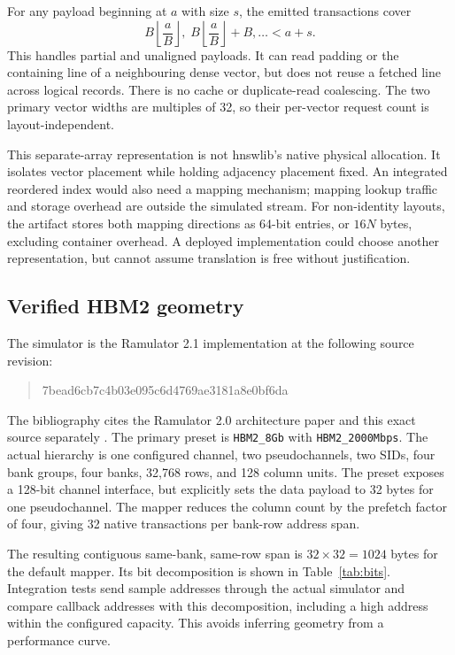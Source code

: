 \documentclass[11pt,a4paper]{report}
\begin{document}
For any payload beginning at $a$ with size $s$, the emitted transactions cover
\begin{equation}
 B\left\lfloor\frac{a}{B}\right\rfloor,\;B\left\lfloor\frac{a}{B}\right\rfloor+B,\ldots < a+s.
\end{equation}
This handles partial and unaligned payloads. It can read padding or the containing line of a neighbouring dense vector, but does not reuse a fetched line across logical records. There is no cache or duplicate-read coalescing. The two primary vector widths are multiples of 32, so their per-vector request count is layout-independent.

This separate-array representation is not hnswlib's native physical allocation. It isolates vector placement while holding adjacency placement fixed. An integrated reordered index would also need a mapping mechanism; mapping lookup traffic and storage overhead are outside the simulated stream. For non-identity layouts, the artifact stores both mapping directions as 64-bit entries, or $16N$ bytes, excluding container overhead. A deployed implementation could choose another representation, but cannot assume translation is free without justification.

\subsection{Verified HBM2 geometry}
\label{sec:geometry}
The simulator is the Ramulator 2.1 implementation at the following source revision:
\begin{quote}\small\ttfamily
7bead6cb7c4b03e095c6d4769ae3181a8e0bf6da
\end{quote}
The bibliography cites the Ramulator 2.0 architecture paper and this exact source separately \cite{ramulator,ramsource}. The primary preset is \texttt{HBM2\_8Gb} with \texttt{HBM2\_2000Mbps}. The actual hierarchy is one configured channel, two pseudochannels, two SIDs, four bank groups, four banks, 32,768 rows, and 128 column units. The preset exposes a 128-bit channel interface, but explicitly sets the data payload to 32 bytes for one pseudochannel. The mapper reduces the column count by the prefetch factor of four, giving 32 native transactions per bank-row address span.

The resulting contiguous same-bank, same-row span is $32\times32=1024$ bytes for the default mapper. Its bit decomposition is shown in Table~\ref{tab:bits}. Integration tests send sample addresses through the actual simulator and compare callback addresses with this decomposition, including a high address within the configured capacity. This avoids inferring geometry from a performance curve.
\end{document}
